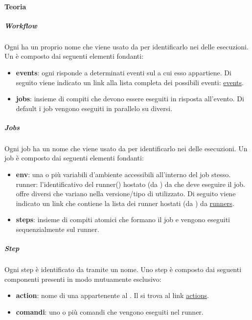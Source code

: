 \paragraph{Teoria}

\subparagraph{Workflow}
Ogni  ha un proprio nome che viene usato da  per identificarlo nei  delle esecuzioni.
Un  è composto dai seguenti elementi fondanti:
\begin{itemize}
    \item \textbf{events}: ogni  risponde a determinati eventi sul  a cui esso appartiene.
    Di seguito viene indicato un link alla lista completa dei possibili eventi: \href{https://docs.github.com/en/actions/writing-workflows/choosing-when-your-workflow-runs/events-that-trigger-workflows}{events}.

    \item \textbf{jobs}: insieme di compiti che devono essere eseguiti in risposta all'evento.
    Di default i job vengono eseguiti in parallelo su  diversi.
\end{itemize}

\subparagraph{Jobs}
Ogni job ha un nome che viene usato da  per identificarlo nei  delle esecuzioni.
Un job è composto dai seguenti elementi fondanti:

\begin{itemize}
    \item \textbf{env}: una o più variabili d'ambiente accessibili all'interno del job stesso.
    runner: l'identificativo del runner() hostato (da ) da  che deve eseguire il job.
     offre diversi  che variano nella versione/tipo di  utilizzato.
    Di seguito viene indicato un link che contiene la lista dei runner hostati (da ) da  \href{https://docs.github.com/en/actions/writing-workflows/workflow-syntax-for-github-actions#choosing-github-hosted-runners}{runners}. 
    \item \textbf{steps}: insieme di compiti atomici che formano il job e vengono eseguiti  sequenzialmente sul runner.
\end{itemize}

\subparagraph{Step}
Ogni step è identificato da  tramite un nome.
Uno step è composto dai seguenti componenti presenti in modo mutuamente esclusivo:
\begin{itemize}
    \item \textbf{action}: nome di una  appartenente al .
    Il  si trova al link \href{https://github.com/marketplace?type=actions}{actions}.
    
    \item \textbf{comandi}: uno o più comandi che vengono eseguiti nel runner.
\end{itemize}

